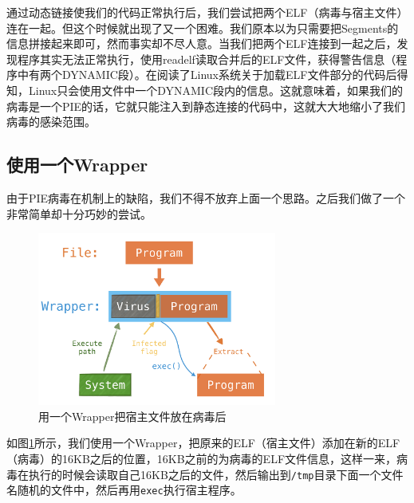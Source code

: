\documentclass[a4paper, 11pt]{article}
\begin{document}
通过动态链接使我们的代码正常执行后，我们尝试把两个ELF（病毒与宿主文件）连在一起。但这个时候就出现了又一个困难。我们原本以为只需要把Segments的信息拼接起来即可，然而事实却不尽人意。当我们把两个ELF连接到一起之后，发现程序其实无法正常执行，使用readelf读取合并后的ELF文件，获得警告信息（程序中有两个DYNAMIC段）。在阅读了Linux系统关于加载ELF文件部分的代码后得知，Linux只会使用文件中一个DYNAMIC段内的信息。这就意味着，如果我们的病毒是一个PIE的话，它就只能注入到静态连接的代码中，这就大大地缩小了我们病毒的感染范围。


\subsection{使用一个Wrapper}
由于PIE病毒在机制上的缺陷，我们不得不放弃上面一个思路。之后我们做了一个非常简单却十分巧妙的尝试。
	\begin{figure}[htbp]
		\centering
		\includegraphics[width = 0.7\textwidth]{figures/fig2_wrapper}
		\caption{用一个Wrapper把宿主文件放在病毒后}
		\label{fig:way3}
	\end{figure}

如图\ref{fig:way3}所示，我们使用一个Wrapper，把原来的ELF（宿主文件）添加在新的ELF（病毒）的16KB之后的位置，16KB之前的为病毒的ELF文件信息，这样一来，病毒在执行的时候会读取自己16KB之后的文件，然后输出到\texttt{/tmp}目录下面一个文件名随机的文件中，然后再用\texttt{exec}执行宿主程序。
\end{document}

